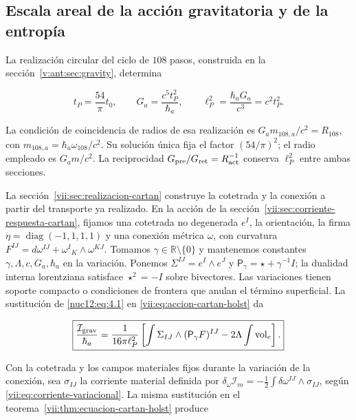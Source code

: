 \subsection{Escala areal de la acción gravitatoria y de la entropía}

La realización circular del ciclo de \(108\) pasos, construida en la sección~\ref{v:ant:sec:gravity}, determina



\begin{equation}
t_P=\frac{54}{\pi}t_0,\qquad
G_a=\frac{c^5t_P^2}{\hbar_a},\qquad
\ell_P^2=\frac{\hbar_aG_a}{c^3}=c^2t_P^2.
\label{nuc12:eq:4.1}
\end{equation}



La condición de coincidencia de radios de esa realización es \(G_a m_{108,a}/c^2=R_{108}\), con \(m_{108,a}=\hbar_a\omega_{108}/c^2\). Su solución única fija el factor \((54/\pi)^2\); el radio empleado es \(G_a m/c^2\). La reciprocidad \(G_{\rm pre}/G_{\rm ret}=R_{\rm act}^{-1}\) conserva \(\ell_P^2\) entre ambas secciones.

La sección~\ref{vii:sec:realizacion-cartan} construye la cotetrada y la conexión a partir del transporte ya realizado. En la acción de la sección~\ref{vii:sec:corriente-respuesta-cartan}, fijamos una cotetrada no degenerada \(e^I\), la orientación, la firma \(\eta=\operatorname{diag}(-1,1,1,1)\) y una conexión métrica \(\omega\), con curvatura \(F^{IJ}=d\omega^{IJ}+\omega^I{}_{K}\wedge\omega^{KJ}\). Tomamos \(\gamma\in\mathbb R\setminus\{0\}\) y mantenemos constantes \(\gamma,\Lambda,c,G_a,\hbar_a\) en la variación. Ponemos \(\Sigma^{IJ}=e^I\wedge e^J\) y \(\mathsf P_\gamma=\star+\gamma^{-1}I\); la dualidad interna lorentziana satisface \(\star^2=-I\) sobre bivectores. Las variaciones tienen soporte compacto o condiciones de frontera que anulan el término superficial. La sustitución de \eqref{nuc12:eq:4.1} en \eqref{vii:eq:accion-cartan-holst} da



\begin{equation}
\boxed{\frac{\mathcal I_{\rm grav}}{\hbar_a}
=\frac1{16\pi\ell_P^2}
\left[\int\Sigma_{IJ}\wedge(\mathsf P_\gamma F)^{IJ}
-2\Lambda\int\operatorname{vol}_e\right].}
\label{nuc12:eq:4.2}
\end{equation}



Con la cotetrada y los campos materiales fijos durante la variación de la conexión, sea \(\sigma_{IJ}\) la corriente material definida por
\(\delta_\omega\mathcal I_m=-\tfrac12\int\delta\omega^{IJ}\wedge\sigma_{IJ}\), según \eqref{vii:eq:corriente-variacional}. La misma sustitución en el teorema~\ref{vii:thm:ecuacion-cartan-holst} produce



